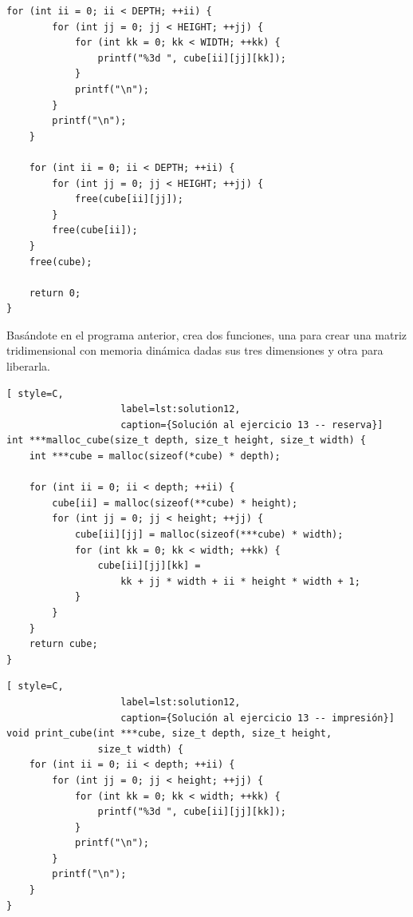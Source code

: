 \documentclass[a4paper]{article}
\begin{document}
\begin{exercises}
\begin{minipage}[H]{\linewidth}
\begin{lstlisting}[style=C,label=lst:solution12, caption={Solución al ejercicio 12}]
    for (int ii = 0; ii < DEPTH; ++ii) {
        for (int jj = 0; jj < HEIGHT; ++jj) {
            for (int kk = 0; kk < WIDTH; ++kk) {
                printf("%3d ", cube[ii][jj][kk]);
            }
            printf("\n");
        }
        printf("\n");
    }

    for (int ii = 0; ii < DEPTH; ++ii) {
        for (int jj = 0; jj < HEIGHT; ++jj) {
            free(cube[ii][jj]);
        }
        free(cube[ii]);
    }
    free(cube);

    return 0;
}
\end{lstlisting}
\end{minipage}


\item Basándote en el programa anterior, crea dos funciones, una para crear
una matriz tridimensional con memoria dinámica dadas sus tres dimensiones y
otra para liberarla.

\noindent
\begin{minipage}[H]{\linewidth}
\mbox{}
\begin{lstlisting}[ style=C,
                    label=lst:solution12,
                    caption={Solución al ejercicio 13 -- reserva}]
int ***malloc_cube(size_t depth, size_t height, size_t width) {
    int ***cube = malloc(sizeof(*cube) * depth);

    for (int ii = 0; ii < depth; ++ii) {
        cube[ii] = malloc(sizeof(**cube) * height);
        for (int jj = 0; jj < height; ++jj) {
            cube[ii][jj] = malloc(sizeof(***cube) * width);
            for (int kk = 0; kk < width; ++kk) {
                cube[ii][jj][kk] =
                    kk + jj * width + ii * height * width + 1;
            }
        }
    }
    return cube;
}
\end{lstlisting}
\end{minipage}

\noindent
\begin{minipage}[H]{\linewidth}
\mbox{}
\begin{lstlisting}[ style=C,
                    label=lst:solution12,
                    caption={Solución al ejercicio 13 -- impresión}]
void print_cube(int ***cube, size_t depth, size_t height,
                size_t width) {
    for (int ii = 0; ii < depth; ++ii) {
        for (int jj = 0; jj < height; ++jj) {
            for (int kk = 0; kk < width; ++kk) {
                printf("%3d ", cube[ii][jj][kk]);
            }
            printf("\n");
        }
        printf("\n");
    }
}
\end{lstlisting}
\end{minipage}


\end{exercises}
\end{document}
